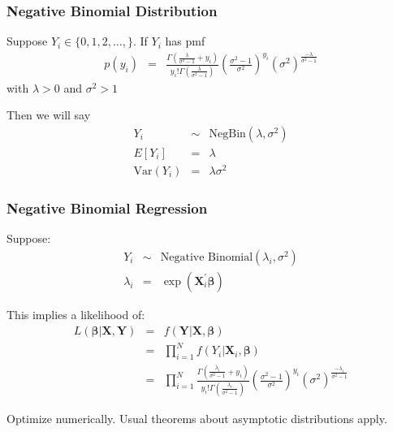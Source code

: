 \documentclass{beamer}
\begin{document}
\begin{frame}
\frametitle{Negative Binomial Distribution}

Suppose $Y_{i} \in \{0, 1, 2, \hdots, \}$.  If $Y_{i}$ has pmf
\begin{eqnarray}
p(y_{i}) & = & \frac{\Gamma\left(\frac{\lambda}{\sigma^2 -1} + y_{i} \right)}{y_{i}! \Gamma\left(\frac{\lambda}{\sigma^2 -1}  \right) } \left(\frac{\sigma^2 - 1}{\sigma^2}\right)^{y_{i}} \left(\sigma^2\right)^{\frac{-\lambda}{\sigma^2 - 1}} \nonumber
\end{eqnarray}
with $\lambda>0$ and $\sigma^2 >1$


Then we will say
\begin{eqnarray}
Y_{i} & \sim & \text{NegBin}(\lambda, \sigma^2)\nonumber \\
E[Y_{i}] &= & \lambda \nonumber \\
\text{Var}(Y_{i}) & = & \lambda \sigma^2 \nonumber
\end{eqnarray}


\end{frame}

\begin{frame}
\frametitle{Negative Binomial Regression}
Suppose:
\begin{eqnarray}
Y_{i} & \sim & \text{Negative Binomial}(\lambda_{i}, \sigma^2)\nonumber \\
\lambda_{i} & = & \exp(\boldsymbol{X}_{i}^{'}\boldsymbol{\beta}) \nonumber
\end{eqnarray}

This implies a likelihood of:
\begin{eqnarray}
L(\boldsymbol{\beta}|\boldsymbol{X}, \boldsymbol{Y}) & = & f(\boldsymbol{Y}| \boldsymbol{X}, \boldsymbol{\beta}) \nonumber \\
& = & \prod_{i=1}^{N} f(Y_{i}| \boldsymbol{X}_{i}, \boldsymbol{\beta}) \nonumber \\
& = & \prod_{i=1}^{N} \frac{\Gamma\left(\frac{\lambda_{i}}{\sigma^2 -1} + y_{i} \right)}{y_{i}! \Gamma\left(\frac{\lambda_{i} }{\sigma^2 -1}  \right) } \left(\frac{\sigma^2 - 1}{\sigma^2}\right)^{y_{i}} \left(\sigma^2\right)^{\frac{-\lambda_{i}}{\sigma^2 - 1}} \nonumber
\end{eqnarray}

Optimize numerically.  Usual theorems about asymptotic distributions apply.
\end{frame}
\end{document}
